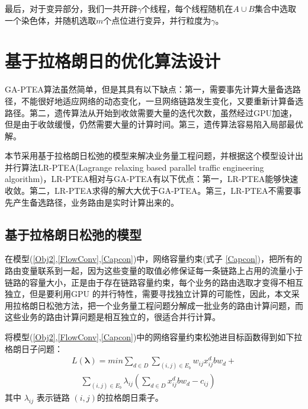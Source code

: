 最后，对于变异部分，我们一共开辟$\gamma$个线程，每个线程随机在$A\cup B$集合中选取一个染色体，并随机选取$m$个点位进行变异，并行粒度为$\gamma$。
\section{基于拉格朗日的优化算法设计}

GA-PTEA算法虽然简单，但是其具有以下缺点：第一，需要事先计算大量备选路径，不能很好地适应网络的动态变化，一旦网络链路发生变化，又要重新计算备选路径。第二，遗传算法从开始到收敛需要大量的迭代次数，虽然经过GPU加速，但是由于收敛缓慢，仍然需要大量的计算时间。第三，遗传算法容易陷入局部最优解。

本节采用基于拉格朗日松弛的模型来解决业务量工程问题，并根据这个模型设计出并行算法LR-PTEA(Lagrange relaxing based parallel traffic engineering algorithm)，LR-PTEA相对与GA-PTEA有以下优点：第一，LR-PTEA能够快速收敛。第二，LR-PTEA求得的解大大优于GA-PTEA。第三，LR-PTEA不需要事先产生备选路径，业务路由是实时计算出来的。
\subsection{基于拉格朗日松弛的模型}
在模型(\ref{Obj2},\ref{FlowConv},\ref{Capcon})中，网络容量约束(式子 \ref{Capcon})，把所有的路由变量联系到一起，因为这些变量的取值必修保证每一条链路上占用的流量小于链路的容量大小，正是由于存在链路容量约束，每个业务的路由选取才变得不相互独立，但是要利用GPU 的并行特性，需要寻找独立计算的可能性，因此，本文采用拉格朗日松弛方法，把一个业务量工程问题分解成一批业务的路由计算问题，而这些业务的路由计算问题是相互独立的，很适合并行计算。

将模型(\ref{Obj2},\ref{FlowConv},\ref{Capcon})中的网络容量约束松弛进目标函数得到如下拉格朗日子问题：
\begin{equation}\label{LagProb}
\begin{split}
L(\mathbf{\lambda})= min\sum\limits_{d \in D}\sum\limits_{(i,j) \in E_b} w_{ij}x_{ij}^d bw_d+ \\ ~~~~~\sum\limits_{(i,j) \in E_b}\lambda_{ij}(\sum\limits_{d \in D} x_{ij}^d bw_d-c_{ij})
\end{split}
\end{equation}
其中 $\lambda_{ij}$ 表示链路 $(i,j)$的拉格朗日乘子。

